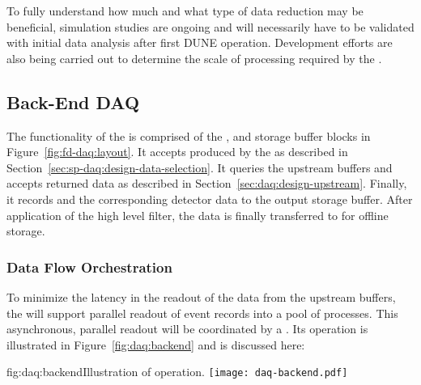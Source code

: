 To fully understand how much and what type of data reduction may be
beneficial, simulation studies are ongoing \cite{bib:docdb11311} and will
necessarily have to be
validated with initial data analysis after
first DUNE  operation. Development efforts are also being
carried out to determine the scale of 
processing required by the .


\subsection{Back-End DAQ}
\label{sec:fd-daq:design-backend}

The functionality of the  is comprised of the ,  and storage buffer blocks in Figure~\ref{fig:fd-daq:layout}. 
It accepts  produced by the  as described in Section~\ref{sec:sp-daq:design-data-selection}. 
It queries the upstream  buffers and accepts returned data as described in Section~\ref{sec:daq:design-upstream}. 
Finally, it records  and the corresponding detector data to the output storage buffer. 
After application of the high level filter, the data is finally transferred to \fnal for offline storage.

\subsubsection{Data Flow Orchestration}


To minimize the latency in the readout of the data from the upstream
 buffers, the  will support parallel readout of event
records into a pool of  processes.  This asynchronous, parallel readout will be coordinated by a .  Its operation is illustrated in Figure~\ref{fig:daq:backend} and is discussed here:

\begin{dunefigure}{fig:daq:backend}{Illustration of   operation.}
  \texttt{[image: daq-backend.pdf]}
\end{dunefigure}

